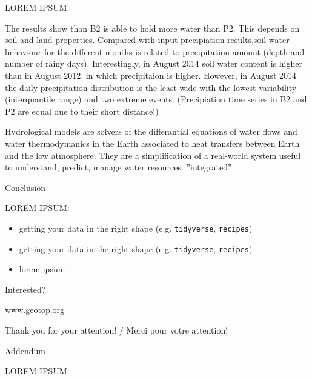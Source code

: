 \documentclass[ignorenonframetext,]{beamer}
\begin{document}
\begin{frame}{LOREM IPSUM}

The results show than B2 is able to hold more water than P2. This
depends on soil and land properties. Compared with input precipiation
results,soil water behaviour for the different months is related to
precipitation amount (depth and number of rainy days). Interestingly, in
August 2014 soil water content is higher than in August 2012, in which
precipitaion is higher. However, in August 2014 the daily precipitation
distribution is the least wide with the lowest variability
(interquantile range) and two extreme events. (Precipiation time series
in B2 and P2 are equal due to their short distance!)

Hydrological models are solvers of the differantial equations of water
flows and water thermodymanics in the Earth associated to heat transfers
between Earth and the low atmosphere. They are a simplification of a
real-world system useful to understand, predict, manage water resources.
''integrated''

\end{frame}

\begin{frame}[fragile]{Conclusion}

LOREM IPSUM:

\begin{itemize}
\item
  getting your data in the right shape (e.g. \texttt{tidyverse},
  \texttt{recipes})
\item
  getting your data in the right shape (e.g. \texttt{tidyverse},
  \texttt{recipes})
\item
  lorem ipsum
\end{itemize}

\end{frame}

\begin{frame}{Interested?}

www.geotop.org

Thank you for your attention! / Merci pour votre attention!

\end{frame}

\begin{frame}{Addendum}

LOREM IPSUM

\end{frame}
\end{document}
